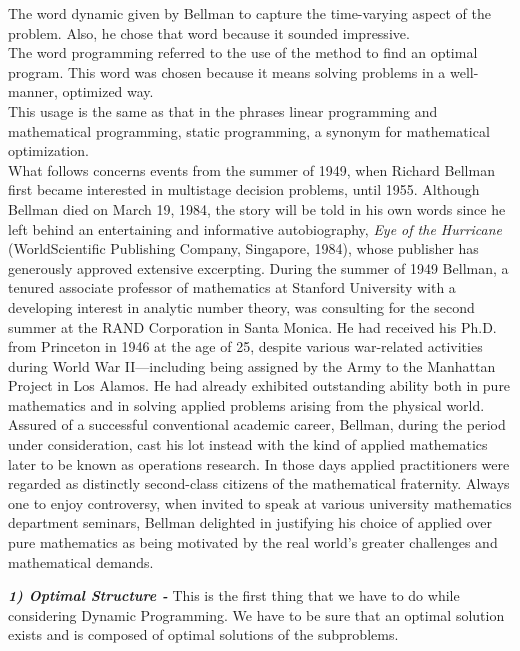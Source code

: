 \documentclass[12pt]{book}
\begin{document}
The word dynamic given by Bellman to capture the time-varying aspect of the problem. Also, he chose that word because it sounded impressive.\\
The word programming referred to the use of the method to find an optimal program. This word was chosen because it means solving problems in a well-manner, optimized way.\\
This usage is the same as that in the phrases linear programming and mathematical programming, static programming, a synonym for mathematical optimization.\\

What follows concerns events from the summer of 1949, when Richard Bellman first became interested in multistage decision problems, until 1955. Although Bellman died on March 19, 1984, the story will be told in his own words since he left behind an entertaining and informative autobiography, \textit{Eye of the Hurricane} (WorldScientific Publishing Company, Singapore, 1984), whose publisher has generously approved extensive excerpting. During the summer of 1949 Bellman, a tenured associate professor of mathematics at Stanford University with a developing interest in analytic number theory, was consulting for the second summer at the RAND Corporation in Santa Monica. He had received his Ph.D. from Princeton in 1946 at the age of 25, despite various war-related activities during World War II—including being assigned by the Army to the Manhattan Project in Los Alamos. He had already exhibited outstanding ability both in pure mathematics and in solving applied problems arising from the physical world. Assured of a successful conventional academic career, Bellman, during the period under consideration, cast his lot instead with the kind of applied mathematics later to be known as operations research. In those days applied practitioners were regarded as distinctly second-class citizens of the mathematical fraternity. Always one to enjoy controversy, when invited to speak at various university mathematics department seminars, Bellman delighted in justifying his choice of applied over pure mathematics as being motivated by the real world’s greater challenges and mathematical demands.

		\textbf{\textit{\large{1)  Optimal Structure -}}} This is the first thing that we have to do while considering Dynamic Programming. We have to be sure that an optimal solution exists and is composed of optimal solutions of the subproblems.\\
\end{document}
